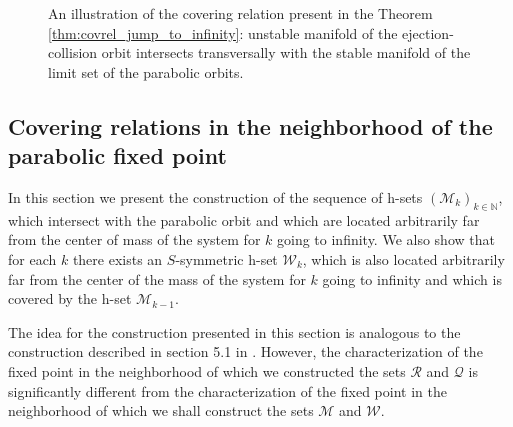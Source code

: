 \documentclass[1p]{article}
\begin{document}
\begin{figure}
\begin{center}
    \end{center}
    \caption{An illustration of the covering relation present in the Theorem \ref{thm:covrel_jump_to_infinity}: unstable manifold of the ejection-collision orbit intersects transversally with the stable manifold of the limit set of the parabolic orbits.}
\end{figure}


\subsection{Covering relations in the neighborhood of the parabolic fixed point}
\label{subsec:covrel_at_infinity}
In this section we present the construction of the sequence of h-sets $(\mathcal{M}_k)_{k \in \mathbb{N}}$, which intersect with the parabolic orbit and which are located arbitrarily far from the center of mass of the system for $k$ going to infinity. We also show that for each $k$ there exists an $S$-symmetric h-set $\mathcal{W}_k$, which is also located arbitrarily far from the center of the mass of the system for $k$ going to infinity and which is covered by the h-set $\mathcal{M}_{k-1}$.

The idea for the construction presented in this section is analogous to the construction described in section 5.1 in \cite{CAPINSKI2026109173}. However, the characterization of the fixed point in the neighborhood of which we constructed the sets $\mathcal{R}$ and $\mathcal{Q}$ is significantly different from the characterization of the fixed point in the neighborhood of which we shall construct the sets $\mathcal{M}$ and $\mathcal{W}$.
\end{document}
